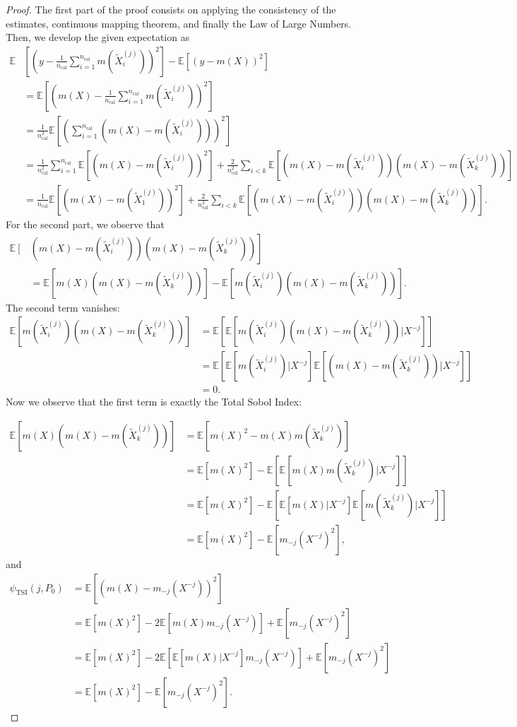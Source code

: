 \documentclass{article}
\theoremstyle{plain}
\theoremstyle{definition}
\theoremstyle{remark}
\newcommand{\e}[1]{\mathbb{E}\left[#1\right]  } %
\begin{document}
\begin{proof}
The first part of the proof consists on applying the consistency of the estimates, continuous mapping theorem, and finally the Law of Large Numbers. Then, we develop the given expectation as
\begin{align*}
    \mathbb{E}&\left[\left(y-\frac{1}{n_{\mathrm{cal}}}\sum_{i=1}^{n_{\mathrm{cal}}}m(\widetilde{X}_i^{(j)})\right)^2\right]-\e{(y-m(X))^2}\\&=\e{\left(m(X)-\frac{1}{n_{\mathrm{cal}}}\sum_{i=1}^{n_{\mathrm{cal}}}m(\widetilde{X}^{(j)}_i)\right)^2}\\
    &=\frac{1}{n_{\mathrm{cal}}^2}\e{\left(\sum_{i=1}^{n_{\mathrm{cal}}}(m(X)-m(\widetilde{X}^{(j)}_i))\right)^2}\\
    &=\frac{1}{n_{\mathrm{cal}}^2}\sum_{i=1}^{n_\mathrm{cal}}\e{(m(X)-m(\widetilde{X}^{(j)}_i))^2}+\frac{2}{n_{\mathrm{cal}}^2}\sum_{i<k}\e{(m(X)-m(\widetilde{X}^{(j)}_i))(m(X)-m(\widetilde{X}^{(j)}_k))}\\
    &=\frac{1}{n_{\mathrm{cal}}}\e{(m(X)-m(\widetilde{X}^{(j)}_1))^2}+\frac{2}{n_{\mathrm{cal}}^2}\sum_{i<k}\e{(m(X)-m(\widetilde{X}^{(j)}_i))(m(X)-m(\widetilde{X}^{(j)}_k))}.
\end{align*}
For the second part, we observe that 
\begin{align*}
    \e{\right.&\left.(m(X)-m(\widetilde{X}^{(j)}_i))(m(X)-m(\widetilde{X}^{(j)}_k))}\\&=\e{m(X)(m(X)-m(\widetilde{X}^{(j)}_k))}-\e{m(\widetilde{X}^{(j)}_i)(m(X)-m(\widetilde{X}^{(j)}_k))}.
\end{align*}
The second term vanishes:
\begin{align*}
    \e{m(\widetilde{X}^{(j)}_i)(m(X)-m(\widetilde{X}^{(j)}_k))}&=\e{\e{m(\widetilde{X}^{(j)}_i)(m(X)-m(\widetilde{X}^{(j)}_k))|X^{-j}}}\\
    &=\e{\e{m(\widetilde{X}^{(j)}_i)|X^{-j}}\e{(m(X)-m(\widetilde{X}^{(j)}_k))|X^{-j}}}\\
    &=0.
\end{align*}
Now we observe that the first term is exactly the Total Sobol Index:

\begin{align*}
    \e{m(X)(m(X)-m(\widetilde{X}^{(j)}_k))}&=\e{m(X)^2-m(X)m(\widetilde{X}^{(j)}_k)}\\
    &=\e{m(X)^2}-\e{\e{m(X)m(\widetilde{X}^{(j)}_k)|X^{-j}}}\\
    &=\e{m(X)^2}-\e{\e{m(X)|X^{-j}}\e{m(\widetilde{X}^{(j)}_k)|X^{-j}}}\\&=\e{m(X)^2}-\e{m_{-j}(X^{-j})^2},
\end{align*}
and 
\begin{align*}
    \psi_\mathrm{TSI}(j, P_0)&=\e{(m(X)-m_{-j}(X^{-j}))^2}\\&=\e{m(X)^2}-2\e{m(X)m_{-j}(X^{-j})}+\e{m_{-j}(X^{-j})^2}\\
    &=\e{m(X)^2}-2\e{\e{m(X)|X^{-j}}m_{-j}(X^{-j})}+\e{m_{-j}(X^{-j})^2}\\
    &=\e{m(X)^2}-\e{m_{-j}(X^{-j})^2}.
\end{align*}


\end{proof}
\end{document}
